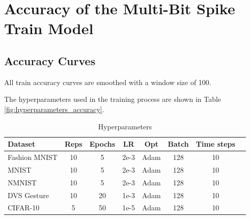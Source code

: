 \chapter{Accuracy of the Multi-Bit Spike Train Model}
\label{appendix:accuracy}

\section{Accuracy Curves}
\label{appendix:accuracy_curves}

    All train accuracy curves are smoothed with a window size of 100.

    The hyperparameters used in the training process are shown in Table \ref{fig:hyperparameters_accuracy}.

    \begin{table}[H]
        \begin{tabularx}{\textwidth}{|X|c|c|c|c|c|c|c|}
            \toprule
            Dataset & Reps & Epochs & LR & Opt & Batch & Time steps \\
            \midrule
            Fashion MNIST & 10 & 5 & 2e-3 & Adam & 128 & 10 \\
            MNIST & 10 & 5 & 2e-3 & Adam & 128 & 10 \\
            NMNIST & 10 & 5 & 2e-3 & Adam & 128 & 10 \\
            DVS Gesture & 10 & 20 & 1e-3 & Adam & 128 & 10 \\
            CIFAR-10 & 5 & 50 & 1e-5 & Adam & 128 & 10 \\
            \bottomrule
        \end{tabularx}
        \caption{Hyperparameters}
        \label{tab:hyperparameters_accuracy}
    \end{table}

